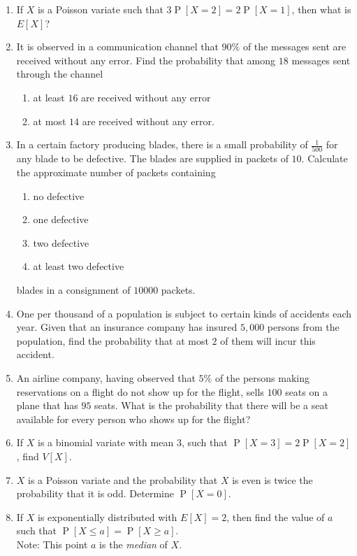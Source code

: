 \documentclass[svgnames]{amsart}
\DeclareMathOperator{\Prob}{P}
\begin{document}
\begin{enumerate}[leftmargin=*]
\item If $X$ is a Poisson variate such that $3 \Prob[X = 2] = 2\Prob[X = 1]$, then what is $E[X]$?

\item  It is observed in a communication channel that $90\%$ of the messages sent are received without any error. Find the probability that among $18$ messages sent through the channel
\begin{enumerate}[label=(\roman*)]
	\item at least $16$ are received without any error
	\item at most $14$ are received without any error.
\end{enumerate}

\item In a certain factory producing blades, there is a small probability of $\frac{1}{500}$ for any blade to be defective. The blades are supplied in packets of $10$. Calculate the approximate number of packets containing
\begin{enumerate}[label=(\roman*)]
	\item no defective
	\item one defective
	\item two defective
	\item at least two defective
\end{enumerate}
blades in a consignment of $10000$ packets.

\item One per thousand of a population is subject to certain kinds of accidents each year. Given that an insurance company has insured $5,000$ persons from the population, find the probability that at most $2$ of them will incur this accident.

\item An airline company, having observed that $5\%$ of the persons making reservations on a flight do not show up for the flight, sells $100$ seats on a plane that has $95$ seats. What is the probability that there will be a seat available for every person who shows up for the flight?

\item If $X$ is a binomial variate with mean $3$, such that $\Prob[X = 3] = 2\Prob[X = 2]$, find $V[X]$.

\item $X$ is a Poisson variate and the probability that $X$ is even is twice the probability that it is odd. Determine $\Prob[X = 0]$.

\item  If $X$ is exponentially distributed with $E[X] = 2$, then find the value of $a$ such that $\Prob[X \le a] = \Prob[X \ge a]$.\\
{\small\color{blue!40!black}
		Note: This point $a$ is the \emph{median} of $X$.
}


\end{enumerate}
\end{document}
